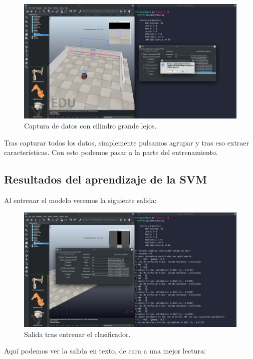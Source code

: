 \documentclass[12pt, spanish]{article}
\begin{document}
\begin{figure}[H]
    \centering
    \includegraphics[width=\textwidth]{cilindro_m_lejos.png}
    \caption{Captura de datos con cilindro grande lejos.}
\end{figure}

Tras capturar todos los datos, simplemente pulsamos agrupar y tras eso extraer características. Con esto podemos pasar a la parte del entrenamiento.


\subsection{Resultados del aprendizaje de la SVM}

Al entrenar el modelo veremos la siguiente salida:

\begin{figure}[H]
    \centering
    \includegraphics[width=\textwidth]{salida_entrenar.png}
    \caption{Salida tras entrenar el clasificador.}
\end{figure}


Aquí podemos ver la salida en texto, de cara a una mejor lectura:
\end{document}
